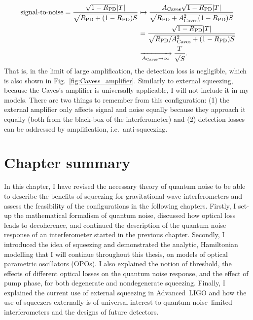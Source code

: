 \begin{align}\text{signal-to-noise} = \frac{\sqrt{1-R_\text{PD}}\abs{T}}{\sqrt{R_\text{PD}+(1-R_\text{PD})S}}&\mapsto\frac{A_\text{Caves}\sqrt{1-R_\text{PD}}\abs{T}}{\sqrt{R_\text{PD}+A_\text{Caves}^2(1-R_\text{PD})S}}\\
&=\frac{\sqrt{1-R_\text{PD}}\abs{T}}{\sqrt{R_\text{PD}/A_\text{Caves}^2+(1-R_\text{PD})S}}\\
&\xrightarrow[A_\text{Caves}\rightarrow\infty]{} \frac{T}{\sqrt S}.
\end{align}
That is, in the limit of large amplification, the detection loss is negligible, which is also shown in Fig.~\ref{fig:Cavess_amplifier}. Similarly to external squeezing, because the Caves's amplifier is universally applicable, I will not include it in my models. There are two things to remember from this configuration: (1) the external amplifier only affects signal and noise equally because they approach it equally (both from the black-box of the interferometer) and (2) detection losses can be addressed by amplification, i.e.\ anti-squeezing.


\section{Chapter summary}

In this chapter, I have revised the necessary theory of quantum noise to be able to describe the benefits of squeezing for gravitational-wave interferometers and assess the feasibility of the configurations in the following chapters. Firstly, I set-up the mathematical formalism of quantum noise, discussed how optical loss leads to decoherence, and continued the description of the quantum noise response of an interferometer started in the previous chapter. Secondly, I introduced the idea of squeezing and demonstrated the analytic, Hamiltonian modelling that I will continue throughout this thesis, on models of optical parametric oscillators (OPOs). I also explained the notion of threshold, the effects of different optical losses on the quantum noise response, and the effect of pump phase, for both degenerate and nondegenerate squeezing. Finally, I explained the current use of external squeezing in Advanced~LIGO and how the use of squeezers externally is of universal interest to quantum noise--limited interferometers and the designs of future detectors.


